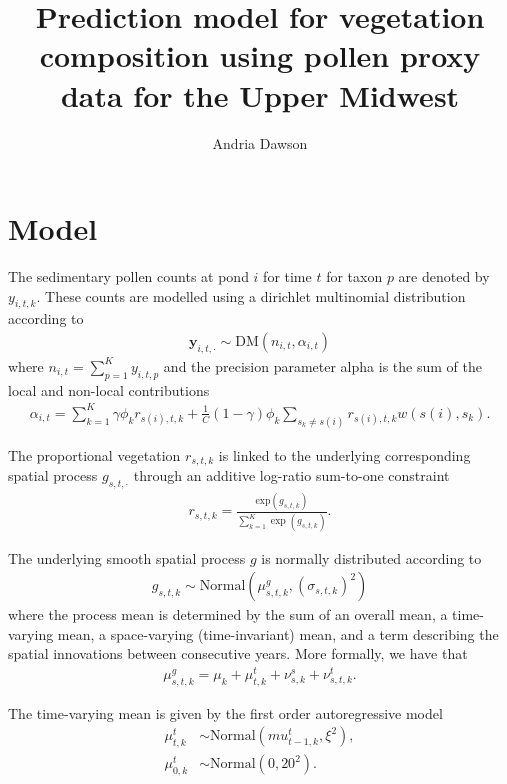 \documentclass[12pt]{article}
\begin{document}
\nocite{*}

\title{Prediction model for vegetation composition using pollen proxy data for the Upper Midwest}

\author{Andria Dawson}

\maketitle

\section{Model}

The sedimentary pollen counts at pond $i$ for time $t$ for taxon $p$ are denoted by $y_{i,t,k}$. These counts are modelled using a dirichlet multinomial distribution according to
\begin{align*}
 \bm{y}_{i,t,\cdot} \sim \text{DM} ( n_{i,t}, \alpha_{i,t} )
\end{align*}
where $n_{i,t} = \sum_{p=1}^{K} y_{i,t,p}$ and the precision parameter alpha is the sum of the local and non-local contributions
\begin{align*}
\alpha_{i,t} = \sum_{k=1}^{K} \gamma \phi_k r_{s(i),t,k} + \frac{1}{C} (1- \gamma) \phi_k \sum_{s_k \neq s(i)} r_{s(i),t,k} w(s(i), s_k).
\end{align*}

The proportional vegetation $r_{s,t,k}$ is linked to the underlying corresponding spatial process $g_{s,t,\cdot}$ through an additive log-ratio sum-to-one constraint
\begin{align*}
r_{s,t,k} = \frac{ \text{exp}(g_{s,t,k}) }{ \sum_{k=1}^K \exp (g_{s,t,k}) }.
\end{align*} 

The underlying smooth spatial process $g$ is normally distributed
according to
\begin{align*} g_{s,t,k} \sim \text{Normal} ( \mu_{s,t,k}^g , (\sigma_{s,t,k})^2 )
\end{align*}
where the process mean is determined by the sum of an overall mean, a time-varying mean, a space-varying (time-invariant) mean, and a term describing the spatial innovations between consecutive years. More formally, we have that
\begin{align*}
  \mu_{s,t,k}^g = \mu_k + \mu_{t,k}^t + \nu_{s,k}^s + \nu_{s,t,k}^t.
\end{align*}

The time-varying mean is given by the first order autoregressive model
\begin{align*}
\mu^t_{t,k} &\sim \text{Normal}(mu^t_{t-1,k}, \xi^2), \\
\mu^t_{0,k} &\sim \text{Normal}(0, 20^2).
\end{align*}
\end{document}
